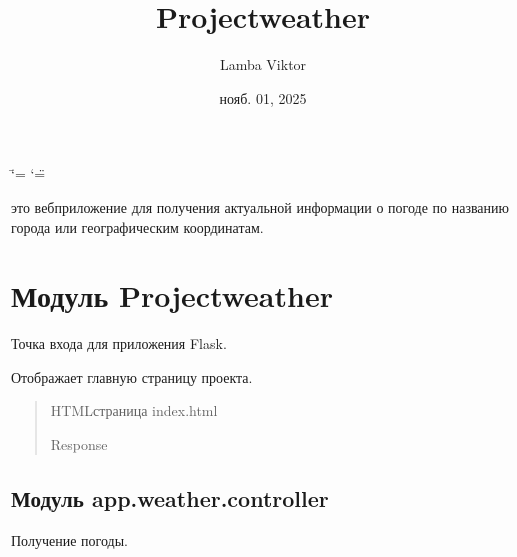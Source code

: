 \documentclass[letterpaper,10pt,russian]{sphinxmanual}
\title{Project\sphinxhyphen{}weather}
\date{нояб. 01, 2025}
\author{Lamba Viktor}
\begin{document}
\ifdefined\shorthandoff
  \ifnum\catcode`\=\string=\active\shorthandoff{=}\fi
  \ifnum\catcode`\"=\active{}\fi
\fi

\pagestyle{empty}
\sphinxmaketitle
\pagestyle{plain}
\sphinxtableofcontents
\pagestyle{normal}
\label{\detokenize{index::doc}}


\sphinxAtStartPar
{} \sphinxhyphen{} это веб\sphinxhyphen{}приложение для получения актуальной информации о погоде по названию города или географическим координатам.

\sphinxstepscope


\chapter{Модуль Project\sphinxhyphen{}weather}
\label{\detokenize{Project_weather:module-main}}\label{\detokenize{Project_weather:project-weather}}\label{\detokenize{Project_weather::doc}}
\sphinxAtStartPar
Точка входа для приложения Flask.

\begin{fulllineitems}
\label{\detokenize{Project_weather:main.index}}
\pysigstartsignatures
\pysiglinewithargsret
{}
{}
{}
\pysigstopsignatures
\sphinxAtStartPar
Отображает главную страницу проекта.
\begin{quote}\begin{description}
\sphinxAtStartPar
HTML\sphinxhyphen{}страница index.html

\sphinxAtStartPar
Response

\end{description}\end{quote}

\end{fulllineitems}



\section{Модуль app.weather.controller}
\label{\detokenize{Project_weather:module-app.weather.controller}}\label{\detokenize{Project_weather:app-weather-controller}}
\sphinxAtStartPar
Получение погоды.
\end{document}
